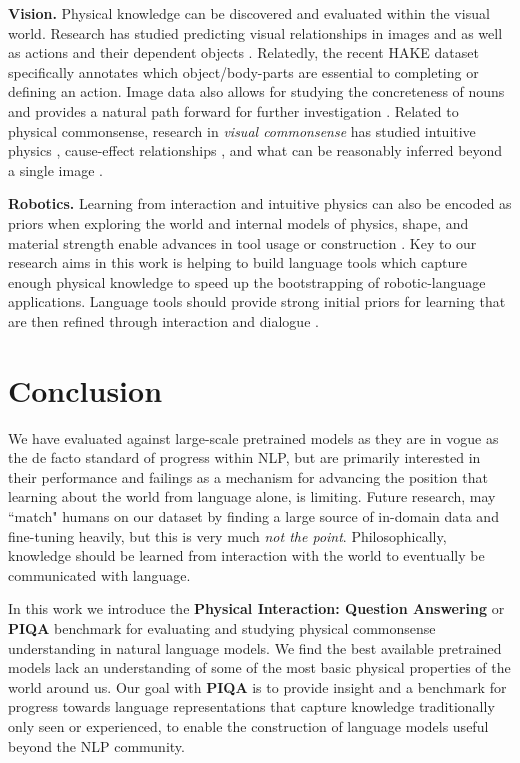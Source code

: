 \textbf{Vision.} Physical knowledge can be discovered and evaluated within the visual world. Research has studied predicting visual relationships in images \cite{krishnavisualgenome} and as well as actions and their dependent objects \cite{yatskar2016}. Relatedly, the recent HAKE dataset \cite{li2019hake} specifically annotates which object/body-parts are essential to completing or defining an action. Image data also allows for studying the concreteness of nouns and provides a natural path forward for further investigation \cite{hessel-etal-2018-quantifying}. Related to physical commonsense, research in \emph{visual commonsense} has studied intuitive physics \cite{NIPS2017_6620}, cause-effect relationships \cite{Mottaghi2016}, and what can be reasonably inferred beyond a single image \cite{Zellers2019a}. 

\textbf{Robotics.} Learning from interaction and intuitive physics \cite{Agrawal2016} can also be encoded as priors when exploring the world \cite{Byravan2018} and internal models of physics, shape, and material strength enable advances in tool usage \cite{Toussaint2018} or construction \cite{Nair2019}. Key to our research aims in this work is helping to build language tools which capture enough physical knowledge to speed up the bootstrapping of robotic-language applications.  Language tools should provide strong initial priors for learning \cite{Tellex2011,Matuszek2018} that are then refined through interaction and dialogue \cite{Gao2016}.

\section{Conclusion}
We have evaluated against large-scale pretrained models as they are in vogue as the de facto standard of progress within NLP, but are primarily interested in their performance and failings as a mechanism for advancing the position that learning about the world from language alone, is limiting.  Future research, may ``match" humans on our dataset by finding a large source of in-domain data and fine-tuning heavily, but this is very much \textit{not the point}.  Philosophically, knowledge should be learned from interaction with the world to eventually be communicated with language.

In this work we introduce the \textbf{Physical Interaction: Question Answering} or \textbf{PIQA} \raisebox{-0.3pt} benchmark for evaluating and studying physical commonsense understanding in natural language models.  We find the best available pretrained models lack an understanding of some of the most basic physical properties of the world around us.  Our goal with \textbf{PIQA} is to provide insight and a benchmark for progress towards language representations that capture knowledge traditionally only seen or experienced, to enable the construction of language models useful beyond the NLP community.


